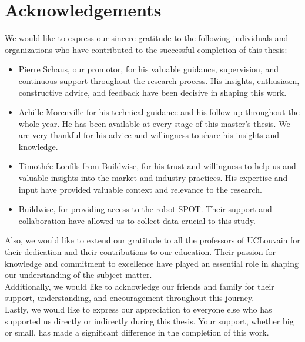 \section*{Acknowledgements}
We would like to express our sincere gratitude to the following individuals and organizations who have contributed to the successful completion of this thesis:
\begin{itemize}
    \item Pierre Schaus, our promotor, for his valuable guidance, supervision, and continuous support throughout the research process. His insights, enthusiasm, constructive advice, and feedback have been decisive in shaping this work.
    \item Achille Morenville for his technical guidance and his follow-up throughout the whole year. He has been available at every stage of this master's thesis. We are very thankful for his advice and willingness to share his insights and knowledge.
    \item Timothée Lonfils from Buildwise, for his trust and willingness to help us and valuable insights into the market and industry practices. His expertise and input have provided valuable context and relevance to the research.
    \item Buildwise, for providing access to the robot SPOT. Their support and collaboration have allowed us to collect data crucial to this study.
\end{itemize}

Also, we would like to extend our gratitude to all the professors of UCLouvain for their dedication and their contributions to our education. Their passion for knowledge and commitment to excellence have played an essential role in shaping our understanding of the subject matter.\\

Additionally, we would like to acknowledge our friends and family for their support, understanding, and encouragement throughout this journey.\\

Lastly, we would like to express our appreciation to everyone else who has supported us directly or indirectly during this thesis. Your support, whether big or small, has made a significant difference in the completion of this work.